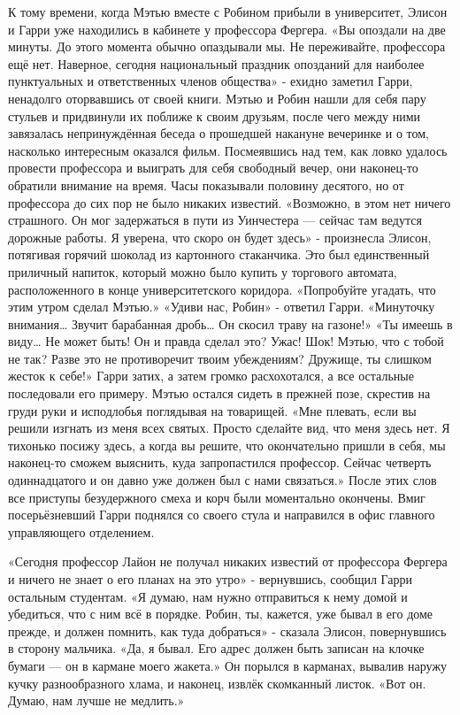 \documentclass[a4paper,12pt]{book}
\begin{document}
	К тому времени, когда Мэтью вместе с Робином прибыли в университет, Элисон и Гарри уже находились в кабинете у профессора Фергера.
	«Вы опоздали на две минуты. До этого момента обычно опаздывали мы. Не переживайте, профессора ещё нет. Наверное, сегодня национальный праздник опозданий для наиболее пунктуальных и ответственных членов общества» - ехидно заметил Гарри, ненадолго оторвавшись от своей книги.
	Мэтью и Робин нашли для себя пару стульев и придвинули их поближе к своим друзьям, после чего между ними завязалась непринуждённая беседа о прошедшей накануне вечеринке и о том, насколько интересным оказался фильм. Посмеявшись над тем, как ловко удалось провести профессора и выиграть для себя свободный вечер, они наконец-то обратили внимание на время. Часы показывали половину десятого, но от профессора до сих пор не было никаких известий.
	«Возможно, в этом нет ничего страшного. Он мог задержаться в пути из Уинчестера — сейчас там ведутся дорожные работы. Я уверена, что скоро он будет здесь» - произнесла Элисон, потягивая горячий шоколад из картонного стаканчика. Это был единственный приличный напиток, который можно было купить у торгового автомата, расположенного в конце университетского коридора.
	«Попробуйте угадать, что этим утром сделал Мэтью.»
	«Удиви нас, Робин» - ответил Гарри.
	«Минуточку внимания…  Звучит барабанная дробь… Он скосил траву на газоне!»
	«Ты имеешь в виду… Не может быть! Он и правда сделал это? Ужас! Шок! Мэтью, что с тобой не так? Разве это не противоречит твоим убеждениям? Дружище, ты слишком жесток к себе!»
	Гарри затих, а затем громко расхохотался, а все остальные последовали его примеру. Мэтью остался сидеть в прежней позе, скрестив на груди руки и исподлобья поглядывая на товарищей.
	«Мне плевать, если вы решили изгнать из меня всех святых. Просто сделайте вид, что меня здесь нет. Я тихонько посижу здесь, а когда вы решите, что окончательно пришли в себя, мы наконец-то сможем выяснить, куда запропастился профессор. Сейчас четверть одиннадцатого и он давно уже должен был с нами связаться.»
	После этих слов все приступы безудержного смеха и корч были моментально окончены. Вмиг посерьёзневший Гарри поднялся со своего стула и направился в офис главного управляющего отделением.

	«Сегодня профессор Лайон не получал никаких известий от профессора Фергера и ничего не знает о его планах на это утро» - вернувшись, сообщил Гарри остальным студентам.
	«Я думаю, нам нужно отправиться к нему домой и убедиться, что с ним всё в порядке. Робин, ты, кажется, уже бывал в его доме прежде, и должен помнить, как туда добраться» - сказала Элисон, повернувшись в сторону мальчика.
	«Да, я бывал. Его адрес должен быть записан на клочке бумаги — он в кармане моего жакета.»
	Он порылся в карманах, вывалив наружу кучку разнообразного хлама, и наконец, извлёк скомканный листок.
	«Вот он. Думаю, нам лучше не медлить.»
	
\end{document}
